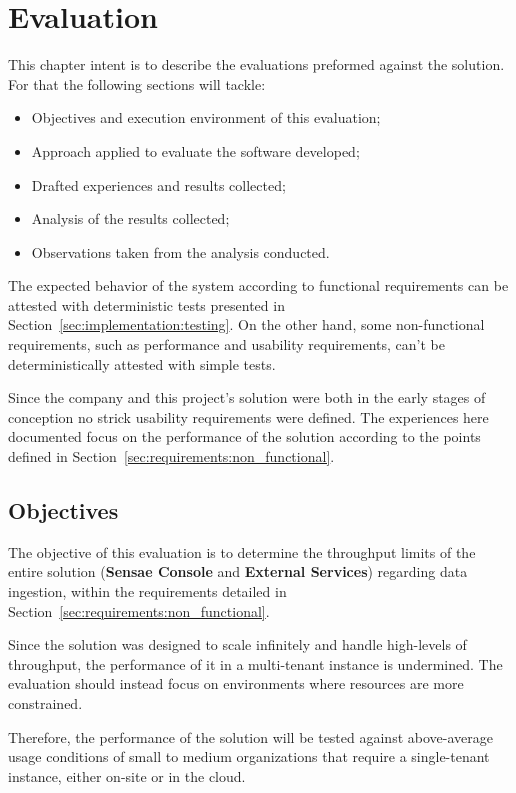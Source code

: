 \chapter{Evaluation}
\label{chap:evaluation}

This chapter intent is to describe the evaluations preformed against the solution. For that the following sections will tackle:

\begin{itemize}
    \item Objectives and execution environment of this evaluation;
    \item Approach applied to evaluate the software developed;
    \item Drafted experiences and results collected;
    \item Analysis of the results collected;
    \item Observations taken from the analysis conducted.
\end{itemize}

The expected behavior of the system according to functional requirements can be attested with deterministic tests presented in Section~\ref{sec:implementation:testing}. On the other hand, some non-functional requirements, such as performance and usability requirements, can't be deterministically attested with simple tests.

Since the company and this project's solution were both in the early stages of conception no strick usability requirements were defined. The experiences here documented focus on the performance of the solution according to the points defined in Section~\ref{sec:requirements:non_functional}.

\section{Objectives}
\label{sec:evaluation:objectives}

The objective of this evaluation is to determine the throughput limits of the entire solution (\textbf{Sensae Console} and \textbf{External Services}) regarding data ingestion, within the requirements detailed in Section~\ref{sec:requirements:non_functional}.

Since the solution was designed to scale infinitely and handle high-levels of throughput, the performance of it in a multi-tenant instance is undermined. The evaluation should instead focus on environments where resources are more constrained.

Therefore, the performance of the solution will be tested against above-average usage conditions of small to medium organizations that require a single-tenant instance, either on-site or in the cloud.

